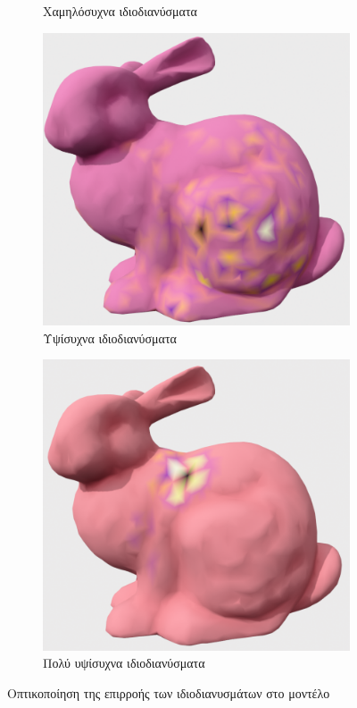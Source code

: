 \documentclass[draft]{article}
\begin{document}
\begin{figure}[h]
\begin{subfigure}{0.45\textwidth}
		\caption{Χαμηλόσυχνα ιδιοδιανύσματα}
		\label{fig:vis2}
	\end{subfigure}
	\begin{subfigure}{0.45\textwidth}
		\includegraphics[width=\textwidth]{"h_freq.png"}
		\caption{Υψίσυχνα ιδιοδιανύσματα}
		\label{fig:vis3}
	\end{subfigure}
	\begin{subfigure}{0.45\textwidth}
		\includegraphics[width=\textwidth]{"vh_freq.png"}
		\caption{Πολύ υψίσυχνα ιδιοδιανύσματα}
		\label{fig:vis4}
	\end{subfigure}
	\caption{Οπτικοποίηση της επιρροής των ιδιοδιανυσμάτων στο μοντέλο}
	\label{fig:visualization}
\end{figure}
\end{document}

